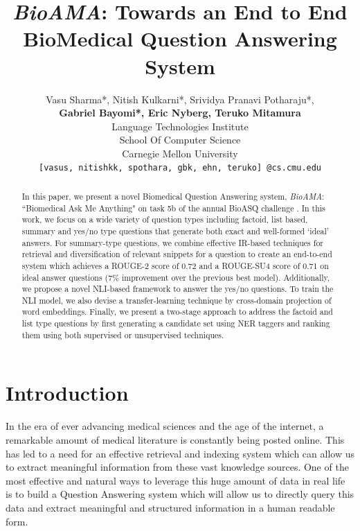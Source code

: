 \documentclass[11pt,a4paper]{article}
\title{\textit{BioAMA}: Towards an End to End BioMedical Question Answering System}
\author{Vasu Sharma*, Nitish Kulkarni*, Srividya Pranavi Potharaju*, \\\textbf{Gabriel Bayomi*, Eric Nyberg, Teruko Mitamura}\\
  Language Technologies Institute \\
  School Of Computer Science \\
  Carnegie Mellon University \\
  {\tt [vasus, nitishkk, spothara, gbk, ehn, teruko] @cs.cmu.edu}\\
  }
\date{}
\begin{document}
\maketitle
\begin{abstract}
In this paper, we present a novel Biomedical Question Answering system, \textit{BioAMA}: ``Biomedical Ask Me Anything" on task 5b of the annual BioASQ challenge \cite{bioasq}. In this work, we focus on a wide variety of question types including factoid, list based, summary and yes/no type questions that generate both exact and well-formed `ideal' answers. For summary-type questions, we combine effective IR-based techniques for retrieval and diversification of relevant snippets for a question to create an end-to-end system which achieves a ROUGE-2 score of 0.72 and a ROUGE-SU4 score of 0.71 on ideal answer questions (7\%  improvement over the previous best model). Additionally, we propose a novel NLI-based framework to answer the yes/no questions. To train the NLI model, we also devise a transfer-learning technique by cross-domain projection of word embeddings. Finally, we present a two-stage approach to address the factoid and list type questions by first generating a candidate set using NER taggers and ranking them using both supervised or unsupervised techniques.

\end{abstract}


\section{Introduction}
In the era of ever advancing medical sciences and the age of the internet, a remarkable amount of medical literature is constantly being posted online. This has led to a need for an effective retrieval and indexing system which can allow us to extract meaningful information from these vast knowledge sources. One of the most effective and natural ways to leverage this huge amount of data in real life is to build a Question Answering system which will allow us to directly query this data and extract meaningful and structured information in a human readable form. 
\end{document}
